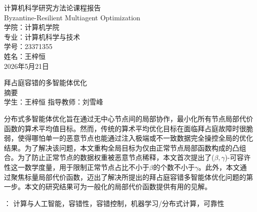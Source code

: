\documentclass[12pt,hyperref,a4paper,UTF8]{ctexart}
\numberwithin{equation}{section}
\numberwithin{figure}{section}
\numberwithin{table}{section}
\begin{document}
\begin{titlepage}
    \centering
    \vspace*{2cm}
    {\heiti\Huge 计算机科学研究方法论课程报告}\\[1.5cm]
    {\heiti\Large Byzantine-Resilient Multiagent Optimization}\\[4cm]
    
    {\kaishu\Large 学院：计算机学院}\\[1cm]
    {\kaishu\Large 专业：计算机科学与技术}\\[1cm]
    {\kaishu\Large 学号：23371355}\\[1cm]
    {\kaishu\Large 姓名：王梓恒}\\[1cm]
    
    \vfill
    {\kaishu\Large 2026年5月21日}
\end{titlepage}
\clearpage

\setcounter{page}{1}

\begin{center}
    {\heiti{} 拜占庭容错的多智能体优化} \\[2ex]   %
    {\heiti{} 摘要} \\[2ex]                         %
    {\normalfont{} 学生：王梓恒 \qquad 指导教师：刘雪峰} \\[2ex]  %
\end{center}

\noindent \quad \quad  分布式多智能体优化旨在通过无中心节点间的局部协作，最小化所有节点局部代价函数的算术平均值目标。然而，传统的算术平均优化目标在面临拜占庭故障时很脆弱，使得哪怕单一的恶意节点也能通过注入极端或不一致数据完全操控全局的优化结果。为了解决该问题，本文重构全局目标为仅由正常节点局部函数构成的凸组合。为了防止正常节点的数据权重被恶意节点稀释，本文首次提出了($\beta, \gamma$)-可容许性这一数学度量，用于限制正常节点占比不小于$\beta$的个数不小于$\gamma$。此外，本文通过聚焦标量局部代价函数，迈出了解决所提出的拜占庭容错多智能体优化问题的第一步。本文的研究结果可为一般化的局部代价函数提供有用的见解。

\vspace{1\baselineskip}
：{ 计算与人工智能，容错性，容错控制，机器学习/分布式计算，可靠性}

\newpage
\tableofcontents
\thispagestyle{plain}

\newpage
{}
\setcounter{page}{1}
\pagestyle{fancy}
\end{document}
